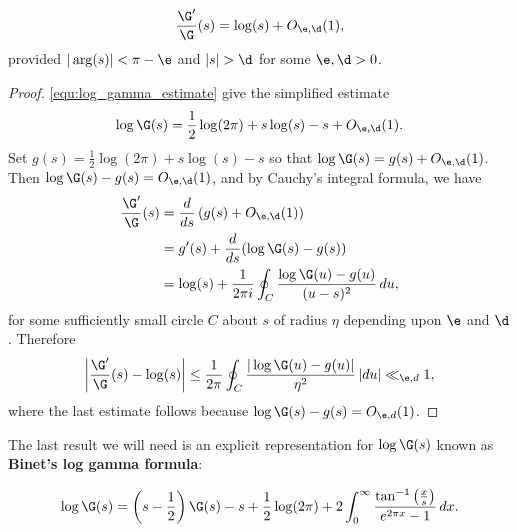       \begin{proposition}\label{equ:approximtion_for_digamma}
      \[
        \frac{\G'}{\G}(s) = \log(s)+O_{\e,\d}(1),
      \]
      provided $|\arg(s)| < \pi-\e$ and $|s| > \d$ for some $\e,\d > 0$.
      \end{proposition}
      \begin{proof}
        \cref{equ:log_gamma_estimate} give the simplified estimate
        \[
          \log\G(s) = \frac{1}{2}\log(2\pi)+s\log(s)-s+O_{\e,\d}(1).
        \]
        Set $g(s) = \frac{1}{2}\log(2\pi)+s\log(s)-s$ so that $\log\G(s) = g(s)+O_{\e,\d}(1)$. Then $\log\G(s)-g(s) = O_{\e,\d}(1)$, and by Cauchy's integral formula, we have
        \begin{align*}
          \frac{\G'}{\G}(s) &= \frac{d}{ds}\left(g(s)+O_{\e,\d}(1)\right) \\
          &= g'(s)+\frac{d}{ds}(\log\G(s)-g(s)) \\
          &= \log(s)+\frac{1}{2\pi i}\oint_{C}\frac{\log\G(u)-g(u)}{(u-s)^{2}}\,du,
        \end{align*}
        for some sufficiently small circle $C$ about $s$ of radius $\eta$ depending upon $\e$ and $\d$. Therefore
        \[
          \left|\frac{\G'}{\G}(s)-\log(s)\right| \le \frac{1}{2\pi}\oint_{C}\frac{|\log\G(u)-g(u)|}{\eta^{2}}\,|du| \ll_{\e,d} 1,
        \]
        where the last estimate follows because $\log\G(s)-g(s) = O_{\e,d}(1)$.
      \end{proof}

      The last result we will need is an explicit representation for $\log\G(s)$ known as \textbf{Binet's log gamma formula}:

      \begin{proposition}
        \phantom{ }
        \[
          \log\G(s) = \left(s-\frac{1}{2}\right)\G(s)-s+\frac{1}{2}\log(2\pi)+2\int_{0}^{\infty}\frac{\tan^{-1}\left(\frac{x}{s}\right)}{e^{2\pi x}-1}\,dx.
        \]
      \end{proposition}